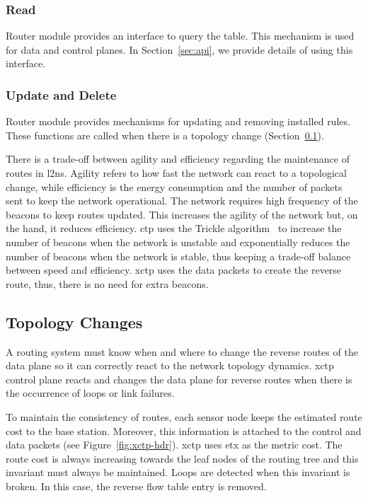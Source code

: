 \subsubsection{Read} Router module provides an interface to query the table. This mechanism is used for data and control planes. In Section~\ref{sec:api}, we provide details of using this interface.

\subsubsection{Update and Delete} Router module provides mechanisms for updating and removing installed rules. These functions are called when there is a topology change (Section~\ref{sec:topology-changes}).

There is a trade-off between agility and efficiency regarding the maintenance of routes in \ac{l2ns}. Agility refers to how fast the network can react to a topological change, while efficiency is the energy consumption and the number of packets sent to keep the network operational. The network requires high frequency of the beacons to keep routes updated. This increases the agility of the network but, on the hand, it reduces efficiency. \ac{ctp} uses the Trickle algorithm~\cite{trickle} to increase the number of beacons when the network is unstable and exponentially reduces the number of beacons when the network is stable, thus keeping a trade-off balance between speed and efficiency. \ac{xctp} uses the data packets to create the reverse route, thus, there is no need for extra beacons.

\subsection{Topology Changes}
\label{sec:topology-changes}

A routing system must know when and where to change the reverse routes of the data plane so it can correctly react to the network topology dynamics. \ac{xctp} control plane reacts and changes the data plane for reverse routes when there is the occurrence of loops or link failures.

To maintain the consistency of routes, each sensor node keeps the estimated route cost to the base station. Moreover, this information is attached to the control and data packets (see Figure~\ref{fig:xctp-hdr}). \ac{xctp} uses \ac{etx} as the metric cost. The route cost is always increasing towards the leaf nodes of the routing tree and this invariant must always be maintained. Loops are detected when this invariant is broken. In this case, the reverse flow table entry is removed.

